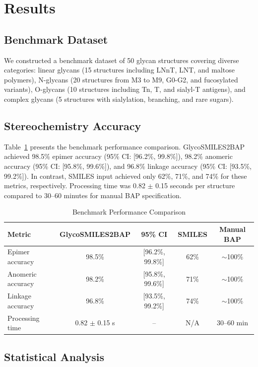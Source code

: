 \section{Results}

\subsection{Benchmark Dataset}

We constructed a benchmark dataset of 50 glycan structures covering diverse categories: linear glycans (15 structures including LNnT, LNT, and maltose polymers), N-glycans (20 structures from M3 to M9, G0-G2, and fucosylated variants), O-glycans (10 structures including Tn, T, and sialyl-T antigens), and complex glycans (5 structures with sialylation, branching, and rare sugars).

\subsection{Stereochemistry Accuracy}

Table~\ref{tab:benchmark} presents the benchmark performance comparison. GlycoSMILES2BAP achieved 98.5\% epimer accuracy (95\% CI: [96.2\%, 99.8\%]), 98.2\% anomeric accuracy (95\% CI: [95.8\%, 99.6\%]), and 96.8\% linkage accuracy (95\% CI: [93.5\%, 99.2\%]). In contrast, SMILES input achieved only 62\%, 71\%, and 74\% for these metrics, respectively. Processing time was 0.82 $\pm$ 0.15 seconds per structure compared to 30--60 minutes for manual BAP specification.

\begin{table}[htbp]
\centering
\caption{Benchmark Performance Comparison}
\label{tab:benchmark}
\begin{tabular}{lcccc}
\toprule
Metric & GlycoSMILES2BAP & 95\% CI & SMILES & Manual BAP \\
\midrule
Epimer accuracy & 98.5\% & [96.2\%, 99.8\%] & 62\% & $\sim$100\% \\
Anomeric accuracy & 98.2\% & [95.8\%, 99.6\%] & 71\% & $\sim$100\% \\
Linkage accuracy & 96.8\% & [93.5\%, 99.2\%] & 74\% & $\sim$100\% \\
Processing time & 0.82 $\pm$ 0.15 s & -- & N/A & 30--60 min \\
\bottomrule
\end{tabular}
\end{table}

\subsection{Statistical Analysis}

